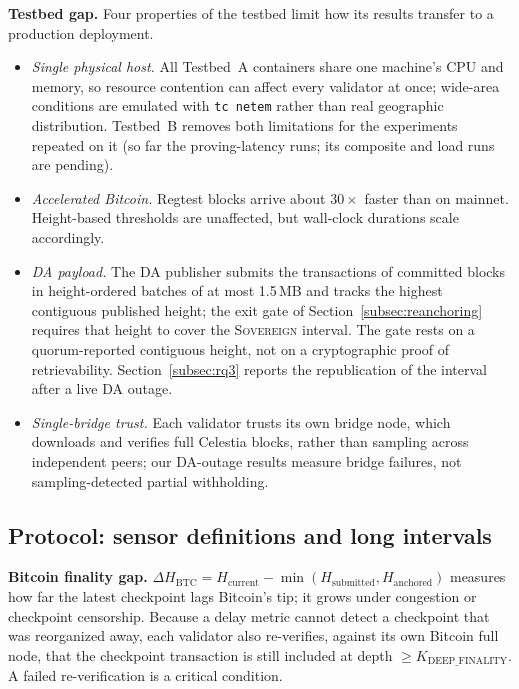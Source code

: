 \textbf{Testbed gap.} Four properties of the testbed limit how its results transfer to a
production deployment.
\begin{itemize}
  \item \emph{Single physical host.} All Testbed~A containers share one
  machine's CPU and memory, so resource contention can affect every validator
  at once; wide-area conditions are emulated with \texttt{tc netem} rather
  than real geographic distribution.
  \iftestbedB Testbed~B removes both limitations for the experiments repeated
  on it (so far the proving-latency runs; its composite and load runs are
  pending).\fi
  \item \emph{Accelerated Bitcoin.} Regtest blocks arrive about $30\times$
  faster than on mainnet. Height-based thresholds are unaffected, but
  wall-clock durations scale accordingly.
  \item \emph{DA payload.} The DA publisher submits the transactions of
  committed blocks in height-ordered batches of at most 1.5\,MB and tracks
  the highest contiguous published height; the exit gate of
  Section~\ref{subsec:reanchoring} requires that height to cover the
  \textsc{Sovereign} interval. The gate rests on a quorum-reported
  contiguous height, not on a cryptographic proof of retrievability.
  Section~\ref{subsec:rq3} reports the republication of the interval after a
  live DA outage.
  \item \emph{Single-bridge trust.} Each validator trusts its own bridge
  node, which downloads and verifies full Celestia blocks, rather than
  sampling across independent peers; our DA-outage results measure bridge
  failures, not sampling-detected partial withholding.
\end{itemize}



\subsection*{Protocol: sensor definitions and long intervals}

\textbf{Bitcoin finality gap.} $\Delta H_{\text{BTC}} = H_{\text{current}} -
\min(H_{\text{submitted}}, H_{\text{anchored}})$ measures how far the latest
checkpoint lags Bitcoin's tip; it grows under congestion or checkpoint
censorship. Because a delay metric cannot detect a checkpoint that was
reorganized away, each validator also re-verifies, against its own Bitcoin
full node, that the checkpoint transaction is still included at depth
$\geq K_{\text{DEEP\_FINALITY}}$. A failed re-verification is a critical
condition.

